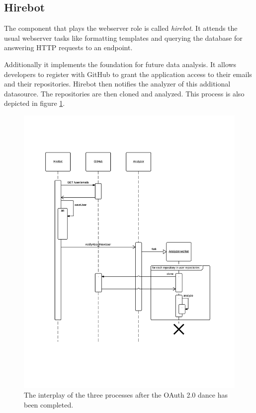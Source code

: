 \subsection{Hirebot}
The component that plays the webserver role is called \textit{hirebot}.
It attends the usual webserver tasks like formatting templates and querying
the database for answering HTTP requests to an endpoint.
\newline

Additionally it implements the foundation for future data analysis.
It allows developers to register with GitHub to grant the application
access to their emails and their repositories. Hirebot then notifies
the analyzer of this additional datasource. The repositories are then cloned
and analyzed. This process is also depicted in figure \ref{fig:regprocess}.

\begin{figure}
  \centering
  \includegraphics[width=35em]{gfx/registersequence.png}
  \caption{The interplay of the three processes after the OAuth 2.0 dance has been completed.}
  \label{fig:regprocess}
\end{figure}

